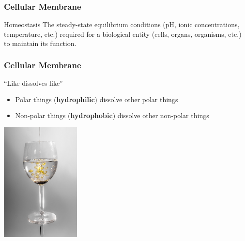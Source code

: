 \documentclass[10pt]{beamer}
\begin{document}
\begin{frame}[t]
\frametitle{Cellular Membrane}
\vspace{0.5cm}

	\begin{center}
		\begin{block}{Homeostasis}
			The steady-state equilibrium conditions (pH, ionic concentrations, temperature, etc.) required for a biological entity (cells, organs, organisms, etc.) to maintain its function.
		\end{block}
	\end{center}
\end{frame}


\begin{frame}[t]
\frametitle{Cellular Membrane}
\vspace{0.5cm}

	``Like dissolves like''\\
	
	\medskip
	
		\begin{itemize}
			\item Polar things (\textbf{\textcolor{myblue}{hydrophilic}}) dissolve other polar things
			\medskip
			\item Non-polar things (\textbf{\textcolor{myblue}{hydrophobic}}) dissolve other non-polar things\\
		\end{itemize}
	
	\vspace{0.5cm}
	
	\begin{center}
		\includegraphics[width=0.3\textwidth]{figures/oil_water.jpg}
	\end{center}	
\end{frame}
\end{document}
